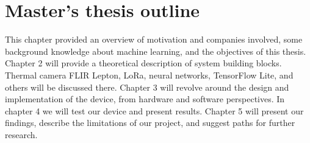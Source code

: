 \section{ Master's thesis outline}
This chapter provided an overview of motivation and companies involved, some background knowledge about machine learning, and the objectives of this thesis.
Chapter 2 will provide a theoretical description of system building blocks. Thermal camera FLIR Lepton, LoRa, neural networks, TensorFlow Lite, and others will be discussed there.
Chapter 3 will revolve around the design and implementation of the device, from hardware and software perspectives.
In chapter 4 we will test our device and present results.
Chapter 5 will present our findings, describe the limitations of our project, and suggest paths for further research.

